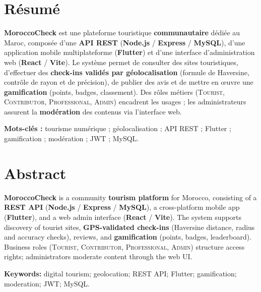 \chapter*{Résumé}

\noindent
\textbf{MoroccoCheck} est une plateforme touristique \textbf{communautaire} dédiée au Maroc, composée d'une \textbf{API REST} (\textbf{Node.js} / \textbf{Express} / \textbf{MySQL}), d'une application mobile multiplateforme (\textbf{Flutter}) et d'une interface d'administration web (\textbf{React} / \textbf{Vite}). Le système permet de consulter des sites touristiques, d'effectuer des \textbf{check-ins validés par géolocalisation} (formule de Haversine, contrôle de rayon et de précision), de publier des avis et de mettre en œuvre une \textbf{gamification} (points, badges, classement). Des rôles métiers (\textsc{Tourist}, \textsc{Contributor}, \textsc{Professional}, \textsc{Admin}) encadrent les usages ; les administrateurs assurent la \textbf{modération} des contenus via l'interface web.

\vspace{1em}
\noindent\textbf{Mots-clés :} tourisme numérique ; géolocalisation ; API REST ; Flutter ; gamification ; modération ; JWT ; MySQL.

\vspace{2em}
\chapter*{Abstract}

\noindent
\textbf{MoroccoCheck} is a community \textbf{tourism platform} for Morocco, consisting of a \textbf{REST API} (\textbf{Node.js} / \textbf{Express} / \textbf{MySQL}), a cross-platform mobile app (\textbf{Flutter}), and a web admin interface (\textbf{React} / \textbf{Vite}). The system supports discovery of tourist sites, \textbf{GPS-validated check-ins} (Haversine distance, radius and accuracy checks), reviews, and \textbf{gamification} (points, badges, leaderboard). Business roles (\textsc{Tourist}, \textsc{Contributor}, \textsc{Professional}, \textsc{Admin}) structure access rights; administrators moderate content through the web UI.

\vspace{1em}
\noindent\textbf{Keywords:} digital tourism; geolocation; REST API; Flutter; gamification; moderation; JWT; MySQL.
